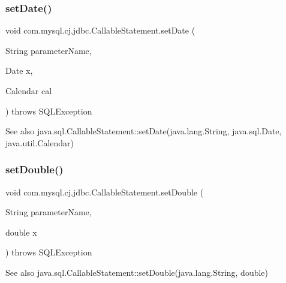 \subsubsection{\texorpdfstring{set\+Date()}{setDate()}\hspace{0.1cm}{\footnotesize\ttfamily [2/2]}}
{\footnotesize\ttfamily void com.\+mysql.\+cj.\+jdbc.\+Callable\+Statement.\+set\+Date (\begin{DoxyParamCaption}\item[{String}]{parameter\+Name,  }\item[{Date}]{x,  }\item[{Calendar}]{cal }\end{DoxyParamCaption}) throws S\+Q\+L\+Exception}

\begin{DoxySeeAlso}{See also}
java.\+sql.\+Callable\+Statement\+::set\+Date(java.\+lang.\+String, java.\+sql.\+Date, java.\+util.\+Calendar) 
\end{DoxySeeAlso}
\mbox{\label{classcom_1_1mysql_1_1cj_1_1jdbc_1_1_callable_statement_abd5c1f562e6a0f06c4ef239a208d1471}} 
\subsubsection{\texorpdfstring{set\+Double()}{setDouble()}}
{\footnotesize\ttfamily void com.\+mysql.\+cj.\+jdbc.\+Callable\+Statement.\+set\+Double (\begin{DoxyParamCaption}\item[{String}]{parameter\+Name,  }\item[{double}]{x }\end{DoxyParamCaption}) throws S\+Q\+L\+Exception}

\begin{DoxySeeAlso}{See also}
java.\+sql.\+Callable\+Statement\+::set\+Double(java.\+lang.\+String, double) 
\end{DoxySeeAlso}
\mbox{\label{classcom_1_1mysql_1_1cj_1_1jdbc_1_1_callable_statement_a419e74b589c54323627a2dbace2148c9}} 
